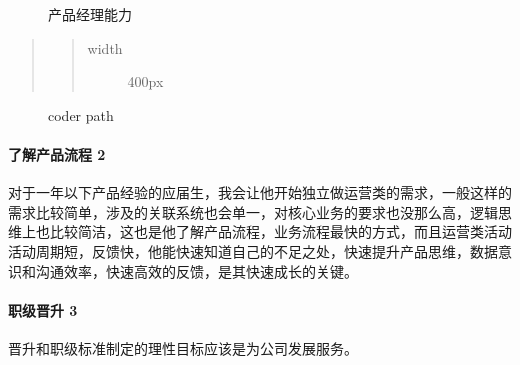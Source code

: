 \documentclass[letterpaper,11pt,english]{sphinxmanual}
\begin{document}
\begin{figure}[H]
\centering
\capstart

\noindent{}
\caption{产品经理能力\sphinxfootnotemark[209]}\label{\detokenize{chapter_experience/career_path:id13}}\end{figure}
%
\begin{footnotetext}[209]\sphinxAtStartFootnote
{}
%
\end{footnotetext}\ignorespaces 
{}
\begin{quote}
\begin{quote}\begin{description}
\item[{width}] \leavevmode
400px

\end{description}\end{quote}
\end{quote}

\begin{figure}[H]
\centering
\capstart

\noindent{}
\caption{coder path}\label{\detokenize{chapter_experience/career_path:id14}}\end{figure}


\paragraph{了解产品流程 2\sphinxfootnotemark[210]}
\label{\detokenize{chapter_experience/career_path:id10}}%
\begin{footnotetext}[210]\sphinxAtStartFootnote
{}
%
\end{footnotetext}\ignorespaces 
对于一年以下产品经验的应届生，我会让他开始独立做运营类的需求，一般这样的需求比较简单，涉及的关联系统也会单一，对核心业务的要求也没那么高，逻辑思维上也比较简洁，这也是他了解产品流程，业务流程最快的方式，而且运营类活动活动周期短，反馈快，他能快速知道自己的不足之处，快速提升产品思维，数据意识和沟通效率，快速高效的反馈，是其快速成长的关键。


\paragraph{职级晋升 3\sphinxfootnotemark[211]}
\label{\detokenize{chapter_experience/career_path:id11}}%
\begin{footnotetext}[211]\sphinxAtStartFootnote
{}
%
\end{footnotetext}\ignorespaces 
晋升和职级标准制定的理性目标应该是为公司发展服务。
\end{document}
